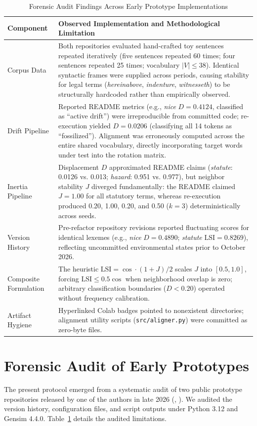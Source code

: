 \documentclass[conference]{IEEEtran}
\begin{document}
\begin{table}[t]
\caption{Forensic Audit Findings Across Early Prototype Implementations}
\label{tab:prototype_review}
\centering
\begin{tabular}{lp{14.8cm}}
\toprule
\textbf{Component} & \textbf{Observed Implementation and Methodological Limitation} \\
\midrule
Corpus Data & Both repositories evaluated hand-crafted toy sentences repeated iteratively (five sentences repeated 60 times; four sentences repeated 25 times; vocabulary $|V| \le 38$). Identical syntactic frames were supplied across periods, causing stability for legal terms (\textit{hereinabove}, \textit{indenture}, \textit{witnesseth}) to be structurally hardcoded rather than empirically observed. \\
Drift Pipeline & Reported README metrics (e.g., \textit{nice} $D=0.4124$, classified as ``active drift'') were irreproducible from committed code; re-execution yielded $D=0.0206$ (classifying all 14 tokens as ``fossilized''). Alignment was erroneously computed across the entire shared vocabulary, directly incorporating target words under test into the rotation matrix. \\
Inertia Pipeline & Displacement $D$ approximated README claims (\textit{statute}: 0.0126 vs. 0.013; \textit{hazard}: 0.951 vs. 0.977), but neighbor stability $J$ diverged fundamentally: the README claimed $J=1.00$ for all statutory terms, whereas re-execution produced 0.20, 1.00, 0.20, and 0.50 ($k=3$) deterministically across seeds. \\
Version History & Pre-refactor repository revisions reported fluctuating scores for identical lexemes (e.g., \textit{nice} $D=0.4890$; \textit{statute} $\text{LSI}=0.8269$), reflecting uncommitted environmental states prior to October 2026. \\
Composite Formulation & The heuristic $\text{LSI} = \cos \cdot (1+J)/2$ scales $J$ into $[0.5, 1.0]$, forcing $\text{LSI} \le 0.5 \cos$ when neighborhood overlap is zero; arbitrary classification boundaries ($D < 0.20$) operated without frequency calibration. \\
Artifact Hygiene & Hyperlinked Colab badges pointed to nonexistent directories; alignment utility scripts (\texttt{src/aligner.py}) were committed as zero-byte files. \\
\bottomrule
\end{tabular}
\end{table}

\section{Forensic Audit of Early Prototypes}
\label{sec:review}
The present protocol emerged from a systematic audit of two public prototype repositories released by one of the authors in late 2026 (, ). We audited the version history, configuration files, and script outputs under Python 3.12 and Gensim 4.4.0. Table~\ref{tab:prototype_review} details the audited limitations.
\end{document}
